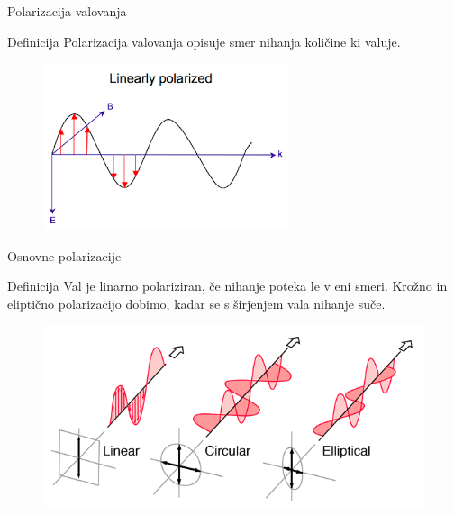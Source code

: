 \documentclass{beamer}
\begin{document}
\begin{frame}{Polarizacija valovanja}

\begin{block}{Definicija}
Polarizacija valovanja opisuje smer nihanja količine ki valuje.
\end{block}

\begin{figure}
\centering
\includegraphics[scale=0.75]{images}
\end{figure}

\end{frame}


\begin{frame}{Osnovne polarizacije}

\begin{block}{Definicija}
Val je linarno polariziran, če nihanje poteka le v eni smeri. Krožno in eliptično polarizacijo dobimo, kadar se s širjenjem vala nihanje suče.
\end{block}

\begin{figure}
\centering
\includegraphics[scale=2]{polcls}
\end{figure}

\end{frame}

\end{document}
